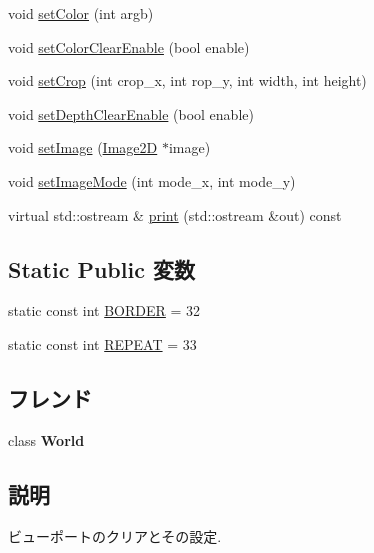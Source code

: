 \begin{CompactItemize}
void \hyperlink{classm3g_1_1Background_38439e862c59a31b90e57c18669061ae}{setColor} (int argb)
\item 
void \hyperlink{classm3g_1_1Background_68e4fe4cf32fe60f166056115081aa65}{setColorClearEnable} (bool enable)
\item 
void \hyperlink{classm3g_1_1Background_e543ac6196bbe65a7af8e6b8686441a7}{setCrop} (int crop\_\-x, int rop\_\-y, int width, int height)
\item 
void \hyperlink{classm3g_1_1Background_0953a713c22fd40cd586bcd8af80075a}{setDepthClearEnable} (bool enable)
\item 
void \hyperlink{classm3g_1_1Background_705b89b41cd1b38f664ed912be44baaa}{setImage} (\hyperlink{classm3g_1_1Image2D}{Image2D} $\ast$image)
\item 
void \hyperlink{classm3g_1_1Background_aba37cb460a2376f1a4722eebb4de9a9}{setImageMode} (int mode\_\-x, int mode\_\-y)
\item 
virtual std::ostream \& \hyperlink{classm3g_1_1Background_6fea17fa1532df3794f8cb39cb4f911f}{print} (std::ostream \&out) const 
\end{CompactItemize}
\subsection*{Static Public 変数}
\begin{CompactItemize}
\item 
static const int \hyperlink{classm3g_1_1Background_ee380e01b33e589c24984e4c4c1c6501}{BORDER} = 32
\item 
static const int \hyperlink{classm3g_1_1Background_a466d02b3d88f856854d0a0955be32e8}{REPEAT} = 33
\end{CompactItemize}
\subsection*{フレンド}
\begin{CompactItemize}
\item 
\hypertarget{classm3g_1_1Background_7b4bcdf992c21ae83363f25df05b1d25}{
class \textbf{World}}
\label{classm3g_1_1Background_7b4bcdf992c21ae83363f25df05b1d25}

\end{CompactItemize}


\subsection{説明}
ビューポートのクリアとその設定. 

